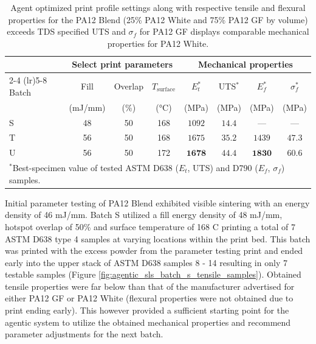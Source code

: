 \begin{table}[t]
  \centering
  \begin{tabular}{lccccccc}
    \toprule
    & \multicolumn{3}{c}{Select print parameters} & \multicolumn{4}{c}{Mechanical properties} \\
    \cmidrule(lr){2-4} \cmidrule(lr){5-8}
    Batch & Fill & Overlap & $T_\mathrm{surface}$ & $E_t^{*}$ & UTS$^{*}$ & $E_f^{*}$ & $\sigma_f^{*}$ \\
    & (mJ/mm) & (\%) & (\si{\celsius}) & (MPa) & (MPa) & (MPa) & (MPa) \\
    \midrule
    S   & 48 & 50 & 168 & $1092$ & $14.4$ & --- & --- \\
    T   & 56 & 50 & 168 & $1675$ & $35.2$ & $1439$ & $47.3$ \\
    U   & 56 & 50 & 172 & $\bm{1678}$ & $\bm{44.4}$ & $\bm{1830}$ & $\bm{60.6}$ \\
    \bottomrule
    \multicolumn{8}{l}{\footnotesize $^{*}$Best-specimen value of tested
      ASTM D638 (\(E_t\), UTS) and D790 (\(E_f\), \(\sigma_f\)) samples.} \\
  \end{tabular}
  \caption{
    Agent optimized print profile settings along with respective tensile and
    flexural properties for the PA12 Blend (25\% PA12 White and 75\% PA12 GF by
    volume) exceeds TDS specified UTS and $\sigma_f$ for PA12 GF displays
    comparable mechanical properties for PA12 White.
  }
  \label{tab:agentic-sls-material-3}
\end{table}

Initial parameter testing of PA12 Blend exhibited visible sintering with an
energy density of 46 mJ/mm. Batch S utilized a fill energy density of 48 mJ/mm,
hotspot overlap of 50\% and surface temperature of 168 \textdegree C printing a
total of 7 ASTM D638 type 4 samples at varying locations within the print bed.
This batch was printed with the excess powder from the parameter testing print
and ended early into the upper stack of ASTM D638 samples 8 - 14 resulting in
only 7 testable samples (Figure \ref{fig:agentic_sls_batch_s_tensile_samples}).
Obtained tensile properties were far below than that of the manufacturer
advertised for either PA12 GF or PA12 White (flexural properties were not
obtained due to print ending early). This however provided a sufficient starting
point for the agentic system to utilize the obtained mechanical properties and
recommend parameter adjustments for the next batch.

